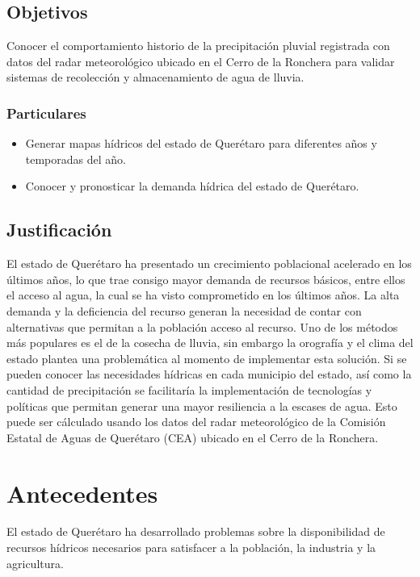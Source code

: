 \documentclass[letterpaper,12pt,oneside]{book}
\begin{document}
    \section{Objetivos}
        Conocer el comportamiento historio de la precipitación pluvial registrada con datos del radar meteorológico ubicado en el Cerro de la Ronchera para validar sistemas de recolección y almacenamiento de agua de lluvia.
        \subsection{Particulares}
            \begin{itemize}
                \item Generar mapas hídricos del estado de Querétaro para diferentes años y temporadas del año.
                \item Conocer y pronosticar la demanda hídrica del estado de Querétaro.
            \end{itemize}

    \section{Justificación}
        El estado de Querétaro ha presentado un crecimiento poblacional acelerado en los últimos años, lo que trae consigo mayor demanda de recursos básicos, entre ellos el acceso al agua, la cual se ha visto comprometido en los últimos años.
        La alta demanda y la deficiencia del recurso generan la necesidad de contar con alternativas que permitan a la población acceso al recurso. Uno de los métodos más populares es el de la cosecha de lluvia, sin embargo la orografía y el clima del estado plantea una problemática al momento de implementar esta solución. Si se pueden conocer las necesidades hídricas en cada municipio del estado, así como la cantidad de precipitación se facilitaría la implementación de tecnologías y políticas que permitan generar una mayor resiliencia a la escases de agua. Esto puede ser cálculado usando los datos del radar meteorológico de la Comisión Estatal de Aguas de Querétaro (CEA) ubicado en el Cerro de la Ronchera.
\newpage
\chapter*{Antecedentes} 
    El estado de Querétaro ha desarrollado problemas sobre la disponibilidad de recursos hídricos necesarios para satisfacer a la población, la industria y la agricultura. 
    
\end{document}
